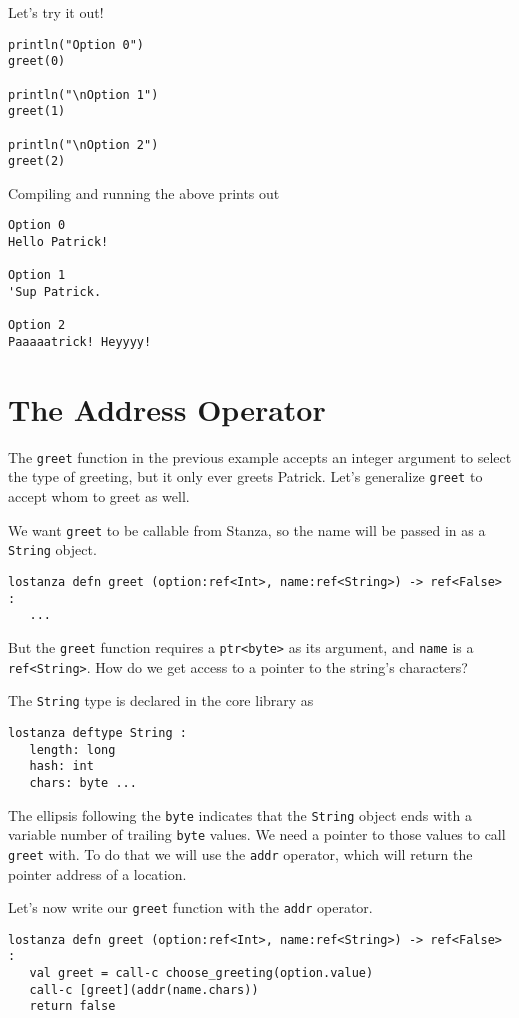 \documentclass[10pt,oneside]{book}
\begin{document}
Let's try it out!
\begin{lstlisting}
println("Option 0")
greet(0)

println("\nOption 1")
greet(1)

println("\nOption 2")
greet(2)
\end{lstlisting}
Compiling and running the above prints out
\begin{lstlisting}
Option 0
Hello Patrick!

Option 1
'Sup Patrick.

Option 2
Paaaaatrick! Heyyyy!
\end{lstlisting}

\section{The Address Operator}
The \texttt{\frenchspacing greet} function in the previous example accepts an integer argument to select the type of greeting, but it only ever greets Patrick. Let's generalize \texttt{\frenchspacing greet} to accept whom to greet as well.

We want \texttt{\frenchspacing greet} to be callable from Stanza, so the name will be passed in as a \texttt{\frenchspacing String} object.
\begin{lstlisting}
lostanza defn greet (option:ref<Int>, name:ref<String>) -> ref<False> :
   ...
\end{lstlisting}

But the \texttt{\frenchspacing greet} function requires a \texttt{\frenchspacing ptr<byte>} as its argument, and \texttt{\frenchspacing name} is a \texttt{\frenchspacing ref<String>}. How do we get access to a pointer to the string's characters?

The \texttt{\frenchspacing String} type is declared in the core library as
\begin{lstlisting}
lostanza deftype String :
   length: long
   hash: int
   chars: byte ...
\end{lstlisting}
The ellipsis following the \texttt{\frenchspacing byte} indicates that the \texttt{\frenchspacing String} object ends with a variable number of trailing \texttt{\frenchspacing byte} values. We need a pointer to those values to call \texttt{\frenchspacing greet} with. To do that we will use the \texttt{\frenchspacing addr} operator, which will return the pointer address of a location.

Let's now write our \texttt{\frenchspacing greet} function with the \texttt{\frenchspacing addr} operator.
\begin{lstlisting}
lostanza defn greet (option:ref<Int>, name:ref<String>) -> ref<False> :
   val greet = call-c choose_greeting(option.value)
   call-c [greet](addr(name.chars))
   return false
\end{lstlisting}
\end{document}

